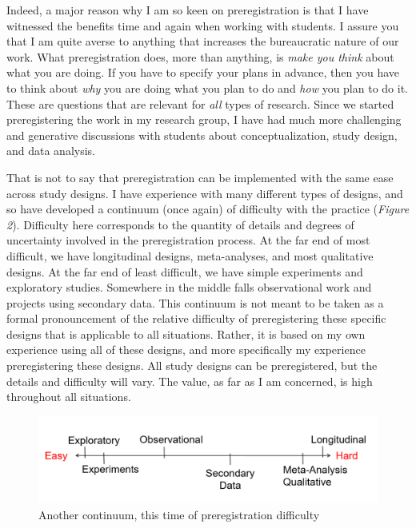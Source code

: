 \documentclass[authordate, empirical]{jote-new-article}
\begin{document}
Indeed, a major reason why I am so keen on preregistration is that I have witnessed the benefits time and again when working with students. I assure you that I am quite averse to anything that increases the bureaucratic nature of our work. What preregistration does, more than anything, is \emph{make you think} about what you are doing. If you have to specify your plans in advance, then you have to think about \emph{why} you are doing what you plan to do and \emph{how} you plan to do it. These are questions that are relevant for \emph{all} types of research. Since we started preregistering the work in my research group, I have had much more challenging and generative discussions with students about conceptualization, study design, and data analysis.







That is not to say that preregistration can be implemented with the same ease across study designs. I have experience with many different types of designs, and so have developed a continuum (once again) of difficulty with the practice (\emph{Figure 2}). Difficulty here corresponds to the quantity of details and degrees of uncertainty involved in the preregistration process. At the far end of most difficult, we have longitudinal designs, meta-analyses, and most qualitative designs. At the far end of least difficult, we have simple experiments and exploratory studies. Somewhere in the middle falls observational work and projects using secondary data. This continuum is not meant to be taken as a formal pronouncement of the relative difficulty of preregistering these specific designs that is applicable to all situations. Rather, it is based on my own experience using all of these designs, and more specifically my experience preregistering these designs. All study designs can be preregistered, but the details and difficulty will vary. The value, as far as I am concerned, is high throughout all situations.



\begin{figure}
  \begin{fullwidth}
    \includegraphics[width=\linewidth]{media/image2.png}

    \caption{Another continuum, this time of preregistration difficulty}

    \label{fig:rId15}

  \end{fullwidth}
\end{figure}
\end{document}
